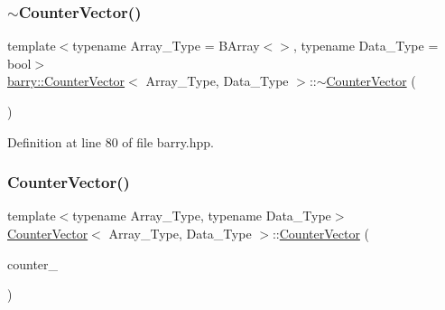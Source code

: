 \mbox{\label{classbarry_1_1_counter_vector_a6a6cfc7b9a3ff220311d312786a8e3eb}} 
\subsubsection{\texorpdfstring{$\sim$\+Counter\+Vector()}{~CounterVector()}}
{\footnotesize\ttfamily template$<$typename Array\+\_\+\+Type = B\+Array$<$$>$, typename Data\+\_\+\+Type = bool$>$ \\
\hyperlink{classbarry_1_1_counter_vector}{barry\+::\+Counter\+Vector}$<$ Array\+\_\+\+Type, Data\+\_\+\+Type $>$\+::$\sim$\hyperlink{classbarry_1_1_counter_vector}{Counter\+Vector} (\begin{DoxyParamCaption}{ }\end{DoxyParamCaption})\hspace{0.3cm}{\ttfamily [inline]}}



Definition at line 80 of file barry.\+hpp.

\mbox{\label{classbarry_1_1_counter_vector_aaa2e5f597feaf8569ca098be1c9069e0}} 
\subsubsection{\texorpdfstring{Counter\+Vector()}{CounterVector()}\hspace{0.1cm}{\footnotesize\ttfamily [2/2]}}
{\footnotesize\ttfamily template$<$typename Array\+\_\+\+Type, typename Data\+\_\+\+Type$>$ \\
\hyperlink{classbarry_1_1_counter_vector}{Counter\+Vector}$<$ Array\+\_\+\+Type, Data\+\_\+\+Type $>$\+::\hyperlink{classbarry_1_1_counter_vector}{Counter\+Vector} (\begin{DoxyParamCaption}\item[{const \hyperlink{classbarry_1_1_counter_vector}{Counter\+Vector}$<$ Array\+\_\+\+Type, Data\+\_\+\+Type $>$ \&}]{counter\+\_\+ }\end{DoxyParamCaption})\hspace{0.3cm}{\ttfamily [inline]}}



